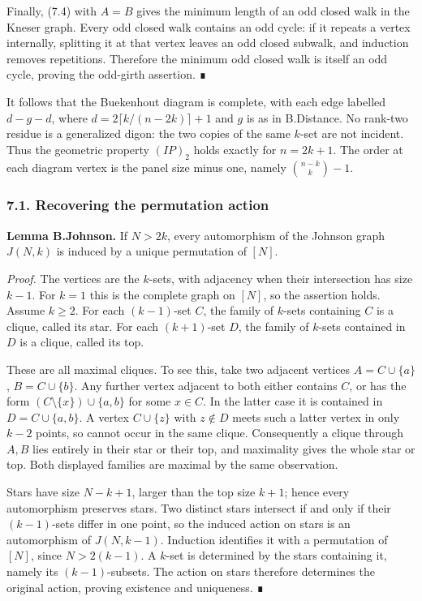 \documentclass[
  11pt,
  a4paper,
]{article}
\begin{document}
Finally, (7.4) with \(A=B\) gives the minimum length of an odd closed
walk in the Kneser graph. Every odd closed walk contains an odd cycle:
if it repeats a vertex internally, splitting it at that vertex leaves an
odd closed subwalk, and induction removes repetitions. Therefore the
minimum odd closed walk is itself an odd cycle, proving the odd-girth
assertion. ∎

It follows that the Buekenhout diagram is complete, with each edge
labelled \(d-g-d\), where \(d=2\lceil k/(n-2k)\rceil+1\) and \(g\) is as
in B.Distance. No rank-two residue is a generalized digon: the two
copies of the same \(k\)-set are not incident. Thus the geometric
property \((IP)_2\) holds exactly for \(n=2k+1\). The order at each
diagram vertex is the panel size minus one, namely \(\binom{n-k}{k}-1\).

\subsubsection{7.1. Recovering the permutation
action}\label{recovering-the-permutation-action}

\textbf{Lemma B.Johnson.} If \(N>2k\), every automorphism of the Johnson
graph \(J(N,k)\) is induced by a unique permutation of \([N]\).

\emph{Proof.} The vertices are the \(k\)-sets, with adjacency when their
intersection has size \(k-1\). For \(k=1\) this is the complete graph on
\([N]\), so the assertion holds. Assume \(k\geq2\). For each
\((k-1)\)-set \(C\), the family of \(k\)-sets containing \(C\) is a
clique, called its star. For each \((k+1)\)-set \(D\), the family of
\(k\)-sets contained in \(D\) is a clique, called its top.

These are all maximal cliques. To see this, take two adjacent vertices
\(A=C\cup\{a\}\), \(B=C\cup\{b\}\). Any further vertex adjacent to both
either contains \(C\), or has the form \((C\setminus\{x\})\cup\{a,b\}\)
for some \(x\in C\). In the latter case it is contained in
\(D=C\cup\{a,b\}\). A vertex \(C\cup\{z\}\) with \(z\notin D\) meets
such a latter vertex in only \(k-2\) points, so cannot occur in the same
clique. Consequently a clique through \(A,B\) lies entirely in their
star or their top, and maximality gives the whole star or top. Both
displayed families are maximal by the same observation.

Stars have size \(N-k+1\), larger than the top size \(k+1\); hence every
automorphism preserves stars. Two distinct stars intersect if and only
if their \((k-1)\)-sets differ in one point, so the induced action on
stars is an automorphism of \(J(N,k-1)\). Induction identifies it with a
permutation of \([N]\), since \(N>2(k-1)\). A \(k\)-set is determined by
the stars containing it, namely its \((k-1)\)-subsets. The action on
stars therefore determines the original action, proving existence and
uniqueness. ∎
\end{document}
